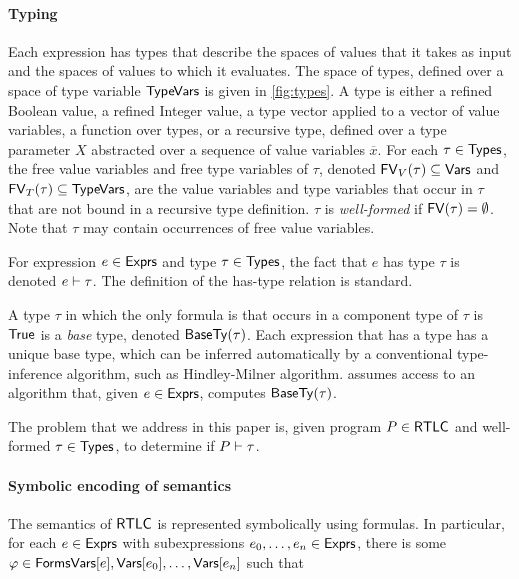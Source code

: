 \paragraph{Typing}
%
Each expression has types that describe the spaces of values that it
takes as input and the spaces of values to which it evaluates.
%
The space of types, defined over a space of type variable $\mathsf{TypeVars}$
is given in \autoref{fig:types}.
%
A type is either a refined Boolean value, %
a refined Integer value, %
a type vector applied to a vector of value variables, %
%
%
a function over types, %
%
or a recursive type, defined over a type parameter $X$ abstracted over
a sequence of value variables $\overline{x}$.
%
For each $\tau \in \mathsf{Types}$, the free value variables and free type
variables of $\tau$, denoted $\mathsf{FV}_V(\tau) \subseteq \mathsf{Vars}$
and $\mathsf{FV}_T(\tau) \subseteq \mathsf{TypeVars}$, are the value variables
and type variables that occur in $\tau$ that are not bound in a
recursive type definition.
%
$\tau$ is \emph{well-formed} if $\mathsf{FV}(\tau) = \emptyset$.
%
Note that $\tau$ may contain occurrences of free value variables.

For expression $e \in \mathsf{Exprs}$ and type $\tau \in \mathsf{Types}$, the fact that
$e$ has type $\tau$ is denoted $e \vdash \tau$.
%
The definition of the has-type relation is standard.

A type $\tau$ in which the only formula is that occurs in a component
type of $\tau$ is $\mathsf{True}$ is a \emph{base} type, denoted
$\mathsf{BaseTy}(\tau)$.
%
Each expression that has a type has a unique base type, which can be
inferred automatically by a conventional type-inference algorithm,
such as Hindley-Milner algorithm.
%
\sys assumes access to an algorithm that, given $e \in \mathsf{Exprs}$,
computes $\mathsf{BaseTy}(\tau)$.
%

The problem that we address in this paper is, given program $P \in
\mathsf{RTLC}$ and well-formed $\tau \in \mathsf{Types}$, to determine if $P \vdash
\tau$.

\paragraph{Symbolic encoding of semantics}
%
The semantics of $\mathsf{RTLC}$ is represented symbolically using \lia
formulas.
%
%
In particular, for each $e \in \mathsf{Exprs}$ with subexpressions $e_0,
\ldots, e_n \in \mathsf{Exprs}$, there is some $\varphi \in \mathsf{Forms}{\mathsf{Vars}[e],
  \mathsf{Vars}[e_0], \ldots, \mathsf{Vars}[e_n]}$ such that

